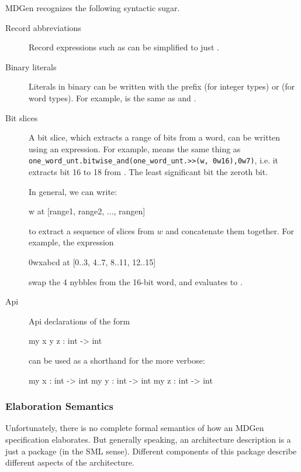    MDGen recognizes the following syntactic sugar.
\begin{description}
\item[Record abbreviations]
Record expressions such as  
can be simplified to just .
\item[Binary literals]
Literals in binary can be written with the prefix  (for integer types)
or  (for word types).   For example,  is the same 
as  and .
\item[Bit slices]
   A bit slice, which extracts a range of bits from a word, can be written
using an  expression.  For example,  
means the same thing as \verb|one_word_unt.bitwise_and(one_word_unt.>>(w, 0w16),0w7)|, i.e.
it extracts bit 16 to 18 from .  
The least significant bit the zeroth bit. 

In general, we can write:
\begin{SML}
  w at [range1, range2, ..., rangen]
\end{SML}
to extract a sequence of slices from $w$ and concatenate them together.
For example, the expression
\begin{SML}
   0wxabcd at [0..3, 4..7, 8..11, 12..15]
\end{SML}
swap the 4 nybbles from the 16-bit word, and evaluates to .

\item[Api]
Api declarations of the form
\begin{SML}
   my x y z : int -> int
\end{SML}
can be used as a shorthand for the more verbose:
\begin{SML}
   my x : int -> int
   my y : int -> int
   my z : int -> int
\end{SML}
\end{description}

\subsubsection{Elaboration Semantics}

   Unfortunately, there is no complete formal semantics of how
an MDGen specification elaborates.  
   But generally speaking, an architecture description is a just a package 
(in the SML sense).   Different components of this package describe 
different aspects of the architecture.


